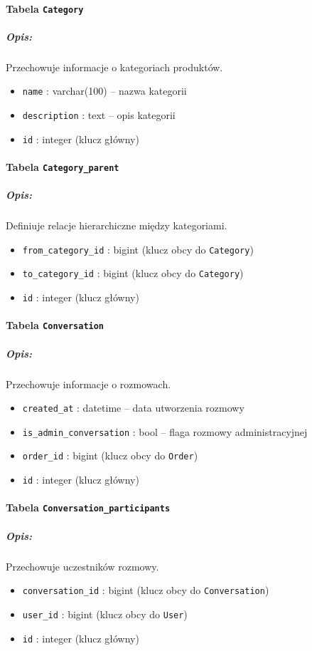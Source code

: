 \documentclass[12pt,a4paper,oneside]{article}
\theoremstyle{definition}
\numberwithin{equation}{section}
\begin{document}
\paragraph{Tabela \texttt{Category}}
\subparagraph{Opis:} Przechowuje informacje o kategoriach produktów.
\begin{itemize}
    \item \texttt{name} : varchar(100) – nazwa kategorii
    \item \texttt{description} : text – opis kategorii
    \item \texttt{id} : integer (klucz główny)
\end{itemize}

\paragraph{Tabela \texttt{Category\string_parent}}
\subparagraph{Opis:} Definiuje relacje hierarchiczne między kategoriami.
\begin{itemize}
    \item \texttt{from\string_category\string_id} : bigint (klucz obcy do \texttt{Category})
    \item \texttt{to\string_category\string_id} : bigint (klucz obcy do \texttt{Category})
    \item \texttt{id} : integer (klucz główny)
\end{itemize}

\paragraph{Tabela \texttt{Conversation}}
\subparagraph{Opis:} Przechowuje informacje o rozmowach.
\begin{itemize}
    \item \texttt{created\string_at} : datetime – data utworzenia rozmowy
    \item \texttt{is\string_admin\string_conversation} : bool – flaga rozmowy administracyjnej
    \item \texttt{order\string_id} : bigint (klucz obcy do \texttt{Order})
    \item \texttt{id} : integer (klucz główny)
\end{itemize}

\paragraph{Tabela \texttt{Conversation\string_participants}}
\subparagraph{Opis:} Przechowuje uczestników rozmowy.
\begin{itemize}
    \item \texttt{conversation\string_id} : bigint (klucz obcy do \texttt{Conversation})
    \item \texttt{user\string_id} : bigint (klucz obcy do \texttt{User})
    \item \texttt{id} : integer (klucz główny)
\end{itemize}
\end{document}

